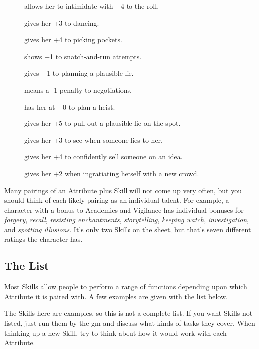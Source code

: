 \begin{multicols}{2}
\begin{description}
  \item[]
    allows her to intimidate with +4 to the roll.
  \item[]
    gives her +3 to dancing.
  \item[]
    gives her +4 to picking pockets.
  \item[]
    shows +1 to snatch-and-run attempts.
  \item[]
    gives +1 to planning a plausible lie.
  \item[]
    means a -1 penalty to negotiations.
  \item[]
    has her at +0 to plan a heist.
  \item[]
    gives her +5 to pull out a plausible lie on the spot.
  \item[]
    gives her +3 to see when someone lies to her.
  \item[]
    gives her +4 to confidently sell someone on an idea.
  \item[]
    gives her +2 when ingratiating herself with a new crowd.
\end{description}

Many pairings of an Attribute plus Skill will not come up very often, but you should think of each likely pairing as an individual talent.
For example, a character with a bonus to Academics and Vigilance has individual bonuses for \textit{forgery}, \textit{recall}, \textit{resisting enchantments}, \textit{storytelling}, \textit{keeping watch}, \textit{investigation}, and \textit{spotting illusions}.
It's only two Skills on the sheet, but that's seven different ratings the character has.

\subsection{The List}
\label{skills}

Most Skills allow people to perform a range of functions depending upon which Attribute it is paired with. A few examples are given with the list below.

The Skills here are examples, so this is not a complete list.
If you want Skills not listed, just run them by the \gls{gm} and discuss what kinds of tasks they cover.
When thinking up a new Skill, try to think about how it would work with each Attribute.


\end{multicols}
